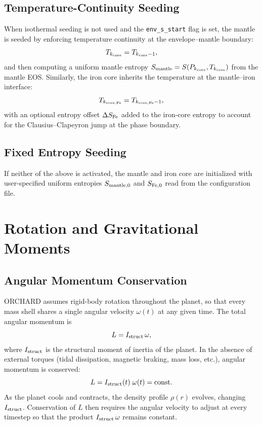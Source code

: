 \documentclass{aastex631}
\begin{document}
\subsection{Temperature-Continuity Seeding}

When isothermal seeding is not used and the \texttt{env\_s\_start} flag
is set, the mantle is seeded by enforcing temperature continuity at the
envelope--mantle boundary:
\begin{equation}
  T_{k_{\rm core}} = T_{k_{\rm core}-1},
\end{equation}
and then computing a uniform mantle entropy
$S_{\rm mantle} = S(P_{k_{\rm core}}, T_{k_{\rm core}})$ from the
mantle EOS.  Similarly, the iron core inherits the temperature at the
mantle--iron interface:
\begin{equation}
  T_{k_{\rm core,Fe}} = T_{k_{\rm core,Fe}-1},
\end{equation}
with an optional entropy offset $\Delta S_{\rm Fe}$ added to the
iron-core entropy to account for the Clausius--Clapeyron jump at
the phase boundary.

\subsection{Fixed Entropy Seeding}

If neither of the above is activated, the mantle and iron core
are initialized with user-specified uniform entropies
$S_{\rm mantle,0}$ and $S_{\rm Fe,0}$ read from the configuration
file.

\section{Rotation and Gravitational Moments}\label{sec:rotation}

\subsection{Angular Momentum Conservation}\label{sec:ang_mom}

ORCHARD assumes rigid-body rotation throughout the planet, so that every
mass shell shares a single angular velocity $\omega(t)$ at any given
time.  The total angular momentum is
\begin{equation}\label{eq:Ltot}
  L = I_{\rm struct}\,\omega,
\end{equation}
where $I_{\rm struct}$ is the structural moment of inertia of the
planet.  In the absence of external torques (tidal dissipation, magnetic
braking, mass loss, etc.), angular momentum is conserved:
\begin{equation}\label{eq:Lconserve}
  L = I_{\rm struct}(t)\;\omega(t) = \text{const}.
\end{equation}
As the planet cools and contracts, the density profile $\rho(r)$
evolves, changing $I_{\rm struct}$.  Conservation of $L$ then requires
the angular velocity to adjust at every timestep so that the product
$I_{\rm struct}\,\omega$ remains constant.
\end{document}
